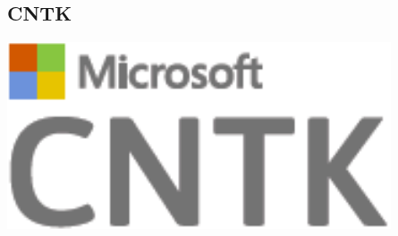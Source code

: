 \documentclass[hyperref={pdfpagelabels=false}]{beamer}
\begin{document}
      




     \subsection{CNTK} %
     \begin{frame}[c] %
       \begin{center}
         \vspace{8mm}
         \includegraphics[scale=0.2]{logo_cntk.png}
       \end{center}
     \end{frame}
\end{document}
